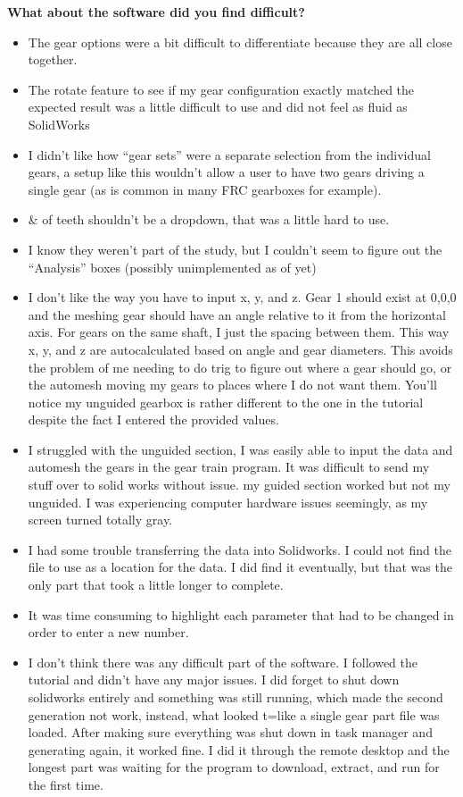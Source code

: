 \noindent\textbf{What about the software did you find difficult?}
\begin{itemize}
\item The gear options were a bit difficult to differentiate because they are all close together.
\item The rotate feature to see if my gear configuration exactly matched the expected result was a little difficult to use and did not feel as fluid as SolidWorks
\item I didn't like how ``gear sets'' were a separate selection from the individual gears, a setup like this wouldn't allow a user to have two gears driving a single gear (as is common in many FRC gearboxes for example).
\item \& of teeth shouldn't be a dropdown, that was a little hard to use.
\item I know they weren't part of the study, but I couldn't seem to figure out the ``Analysis'' boxes (possibly unimplemented as of yet)
\item I don't like the way you have to input x, y, and z. Gear 1 should exist at 0,0,0 and the meshing gear should have an angle relative to it from the horizontal axis. For gears on the same shaft, I just the spacing between them. This way x, y, and z are autocalculated based on angle and gear diameters. This avoids the problem of me needing to do trig to figure out where a gear should go, or the automesh moving my gears to places where I do not want them. You'll notice my unguided gearbox is rather different to the one in the tutorial despite the fact I entered the provided values.
\item I struggled with the unguided section, I was easily able to input the data and automesh the gears in the gear train program. It was difficult to send my stuff over to solid works without issue. my guided section worked but not my unguided. I was experiencing computer hardware issues seemingly, as my screen turned totally gray.
\item I had some trouble transferring the data into Solidworks. I could not find the file to use as a location for the data. I did find it eventually, but that was the only part that took a little longer to complete.
\item It was time consuming to highlight each parameter that had to be changed in order to enter a new number.
\item I don't think there was any difficult part of the software. I followed the tutorial and didn't have any major issues. I did forget to shut down solidworks entirely and something was still running, which made the second generation not work, instead, what looked t=like a single gear part file was loaded. After making sure everything was shut down in task manager and generating again, it worked fine. I did it through the remote desktop and the longest part was waiting for the program to download, extract, and run for the first time.

\end{itemize}

